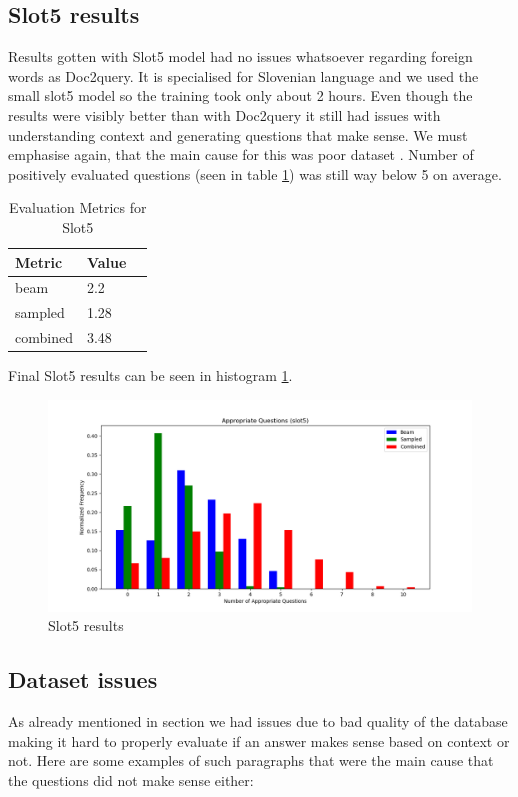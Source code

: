 \documentclass[fleqn,moreauthors,10pt]{ds_report}
\begin{document}
\subsection*{Slot5 results}
Results gotten with Slot5 model had no issues whatsoever regarding foreign words as Doc2query. It is specialised for Slovenian language and we used the small slot5 model so the training took only about 2 hours. Even though the results were visibly better than with Doc2query it still had issues with understanding context and generating questions that make sense. We must emphasise again, that the main cause for this was poor dataset . Number of positively evaluated questions (seen in table \ref{tab:slot5}) was still way below 5 on average.
\begin{table}[h!]
\centering
\begin{tabular}{@{}lll@{}}
\toprule
\textbf{Metric} & \textbf{Value} \\ \midrule
beam & 2.2  \\
sampled & 1.28 \\
combined & 3.48  \\ \bottomrule
\end{tabular}
\caption{Evaluation Metrics for Slot5}
\label{tab:slot5}
\end{table}
Final Slot5 results can be seen in histogram \ref{fig:h2}.
\begin{figure}[htp!]
    \centering
    \includegraphics[width=1\columnwidth]{t5_combined_histogram.png}
    \caption{Slot5 results}
    \label{fig:h2}
\end{figure}


\subsection*{Dataset issues}
As already mentioned in section  we had issues due to bad quality of the database making it hard to properly evaluate if an answer makes sense based on context or not. Here are some examples of such paragraphs that were the main cause that the questions did not make sense either:
\end{document}
